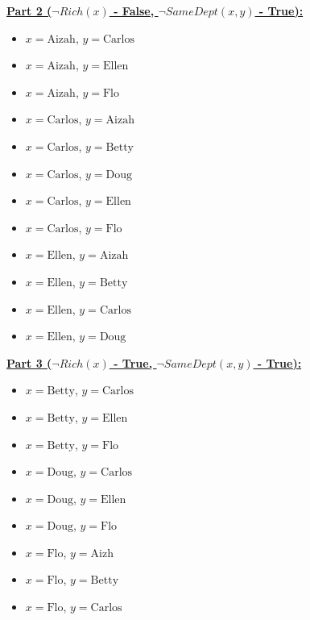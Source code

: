 \documentclass[12pt]{article}
\begin{document}
\begin{enumerate}[a.]
    \bigskip

    \underline{\textbf{Part 2 ($\neg Rich(x)$ - False, $\neg SameDept(x,y)$ - True):}}

    \begin{itemize}
        \item $x = \text{Aizah}$, $y = \text{Carlos}$
        \item $x = \text{Aizah}$, $y = \text{Ellen}$
        \item $x = \text{Aizah}$, $y = \text{Flo}$
        \item $x = \text{Carlos}$, $y = \text{Aizah}$
        \item $x = \text{Carlos}$, $y = \text{Betty}$
        \item $x = \text{Carlos}$, $y = \text{Doug}$
        \item $x = \text{Carlos}$, $y = \text{Ellen}$
        \item $x = \text{Carlos}$, $y = \text{Flo}$
        \item $x = \text{Ellen}$, $y = \text{Aizah}$
        \item $x = \text{Ellen}$, $y = \text{Betty}$
        \item $x = \text{Ellen}$, $y = \text{Carlos}$
        \item $x = \text{Ellen}$, $y = \text{Doug}$
    \end{itemize}

    \bigskip

    \underline{\textbf{Part 3 ($\neg Rich(x)$ - True, $\neg SameDept(x,y)$ - True):}}

    \begin{itemize}
        \item $x = \text{Betty}$, $y = \text{Carlos}$
        \item $x = \text{Betty}$, $y = \text{Ellen}$
        \item $x = \text{Betty}$, $y = \text{Flo}$
        \item $x = \text{Doug}$, $y = \text{Carlos}$
        \item $x = \text{Doug}$, $y = \text{Ellen}$
        \item $x = \text{Doug}$, $y = \text{Flo}$
        \item $x = \text{Flo}$, $y = \text{Aizh}$
        \item $x = \text{Flo}$, $y = \text{Betty}$
        \item $x = \text{Flo}$, $y = \text{Carlos}$
    \end{itemize}


\end{enumerate}
\end{document}
